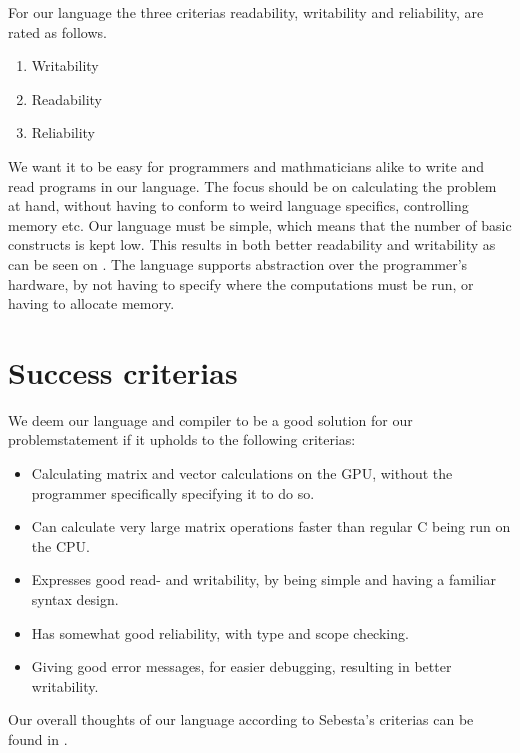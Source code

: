 For our language the three criterias readability, writability and reliability, are rated as follows.

\begin{enumerate}
	\item Writability
	\item Readability
	\item Reliability
\end{enumerate}

We want it to be easy for programmers and mathmaticians alike to write and read programs in our language.
The focus should be on calculating the problem at hand, without having to conform to weird language specifics, controlling memory etc.
Our language must be simple, which means that the number of basic constructs is kept low. 
This results in both better readability and writability as can be seen on .
The language supports abstraction over the programmer's hardware, by not having to specify where the computations must be run, or having to allocate memory.


\section{Success criterias}\label{sec:OurCriterias}
We deem our language and compiler to be a good solution for our problemstatement if it upholds to the following criterias:

\begin{itemize}
	\item Calculating matrix and vector calculations on the GPU, without the programmer specifically specifying it to do so.
	\item Can calculate very large matrix operations faster than regular C being run on the CPU.
	\item Expresses good read- and writability, by being simple and having a familiar syntax design.
	\item Has somewhat good reliability, with type and scope checking.
	\item Giving good error messages, for easier debugging, resulting in better writability.
\end{itemize}

Our overall thoughts of our language according to Sebesta's criterias can be found in .


